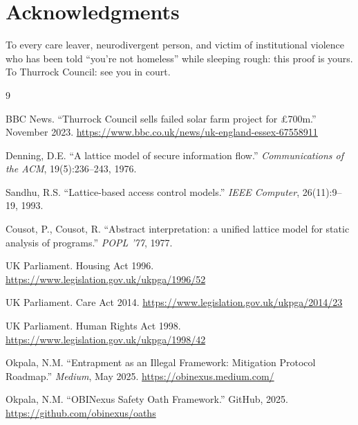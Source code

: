 \documentclass[11pt,a4paper]{article}
\theoremstyle{definition}
\begin{document}
\section*{Acknowledgments}

To every care leaver, neurodivergent person, and victim of institutional violence who has been told ``you're not homeless'' while sleeping rough: this proof is yours. To Thurrock Council: see you in court.

\begin{thebibliography}{9}

BBC News. ``Thurrock Council sells failed solar farm project for £700m.'' November 2023. \url{https://www.bbc.co.uk/news/uk-england-essex-67558911}

Denning, D.E. ``A lattice model of secure information flow.'' \emph{Communications of the ACM}, 19(5):236--243, 1976.

Sandhu, R.S. ``Lattice-based access control models.'' \emph{IEEE Computer}, 26(11):9--19, 1993.

Cousot, P., Cousot, R. ``Abstract interpretation: a unified lattice model for static analysis of programs.'' \emph{POPL '77}, 1977.

UK Parliament. Housing Act 1996. \url{https://www.legislation.gov.uk/ukpga/1996/52}

UK Parliament. Care Act 2014. \url{https://www.legislation.gov.uk/ukpga/2014/23}

UK Parliament. Human Rights Act 1998. \url{https://www.legislation.gov.uk/ukpga/1998/42}

Okpala, N.M. ``Entrapment as an Illegal Framework: Mitigation Protocol Roadmap.'' \emph{Medium}, May 2025. \url{https://obinexus.medium.com/}

Okpala, N.M. ``OBINexus Safety Oath Framework.'' GitHub, 2025. \url{https://github.com/obinexus/oaths}

\end{thebibliography}
\end{document}
